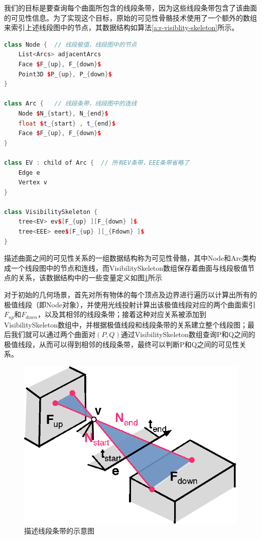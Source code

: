 我们的目标是要查询每个曲面所包含的线段条带，因为这些线段条带包含了该曲面的可见性信息。为了实现这个目标，原始的可见性骨骼技术\cite{a:TheVisibilitySkeleton:APowerfulAndEfficientMulti-PurposeGlobalVisibilityTool}使用了一个额外的数组来索引上述线段图中的节点，其数据结构如算法\ref{a:r-visiblity-skeleton}所示。

\begin{algorithm}
\begin{lstlisting}[language=C++, mathescape]
class Node {  // 线段极值，线段图中的节点
	List<Arcs> adjacentArcs 
	Face $F_{up}, F_{down}$ 
	Point3D $P_{up}, P_{down}$
}
	
class Arc {   // 线段条带，线段图中的连线
	Node $N_{start}, N_{end}$ 
	float $t_{start} , t_{end}$ 
	Face $F_{up}, F_{down}$
}
	
class EV : child of Arc {  // 所有EV条带，EEE条带省略了
	Edge e 
	Vertex v 
}
	
class VisibilitySkeleton { 
	tree<EV> ev$[F_{up} ][F_{down} ]$ 
	tree<EEE> eee$[F_{up} ][_{Fdown} ]$
}
\end{lstlisting}
\caption{描述曲面之间的可见性关系的一组数据结构称为可见性骨骼，其中Node和Arc类构成一个线段图中的节点和连线，而VisibilitySkeleton数组保存着曲面与线段极值节点的关系，该数据结构中的一些变量定义如图\ref{f:r-visibility-skeleton-structure-1}所示}
\label{a:r-visiblity-skeleton}
\end{algorithm}

对于初始的几何场景，首先对所有物体的每个顶点及边界进行遍历以计算出所有的极值线段（即Node对象），并使用光线投射计算出该极值线段对应的两个曲面索引$F_{up}$和$F_{down}$，以及其相邻的线段条带；接着这种对应关系被添加到VisibilitySkeleton数组中，并根据极值线段和线段条带的关系建立整个线段图；最后我们就可以通过两个曲面对$(P,Q)$通过VisibilitySkeleton数组查询P和Q之间的极值线段，从而可以得到相邻的线段条带，最终可以判断P和Q之间的可见性关系。

\begin{figure}
\sidecaption
	\includegraphics[width=.65\textwidth]{figures/r/visibility-skeleton-structure-1}
	\caption{描述线段条带的示意图}
	\label{f:r-visibility-skeleton-structure-1}
\end{figure}

